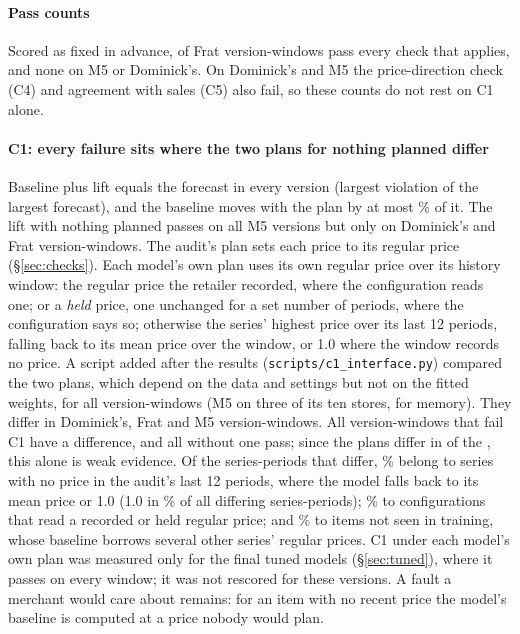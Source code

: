 \paragraph{Pass counts}
Scored as fixed in advance, \rAllF{} of \rWinF{} Frat version-windows pass
every check that applies, and none on M5 or Dominick's. On Dominick's and M5
the price-direction check (C4) and agreement with sales (C5) also fail, so
these counts do not rest on C1 alone.

\paragraph{C1: every failure sits where the two plans for nothing planned differ}
Baseline plus lift equals the forecast in every version (largest violation
\rCaPartsMax{} of the largest forecast), and the baseline moves with the plan by
at most \rCaBaseMax\% of it. The lift with nothing planned passes on all
\rVerM{} M5 versions but only on \rPassDCa{} Dominick's and \rPassFCa{} Frat
version-windows. The audit's plan sets each price to its regular price
(\S\ref{sec:checks}). Each model's own plan uses its own regular price over its
history window: the regular price the retailer recorded, where the
configuration reads one; or a \emph{held} price, one unchanged for a set number
of periods, where the configuration says so; otherwise the series' highest
price over its last 12 periods, falling back to its mean price over the window,
or 1.0 where the window records no price. A script added after the results
(\texttt{scripts/c1\_interface.py}) compared the two plans, which depend on the
data and settings but not on the fitted weights, for all \cIfOf{}
version-windows (M5 on three of its ten stores, for memory). They differ in
\cIfAnyD{} Dominick's, \cIfAnyF{} Frat and \cIfAnyM{} M5 version-windows. All
\cIfFailN{} version-windows that fail C1 have a difference, and all \cIfSameN{}
without one pass; since the plans differ in \cIfDiffN{} of the \cIfOf, this
alone is weak evidence. Of the series-periods that differ, \cIfShareNoReg\%
belong to series with no price in the audit's last 12 periods, where the model
falls back to its mean price or 1.0 (1.0 in \cIfShareOne\% of all differing
series-periods); \cIfShareRule\% to configurations that read a recorded or
held regular price; and \cIfShareNew\% to items not seen in training, whose
baseline borrows several other series' regular prices. C1 under each model's
own plan was measured only for the final tuned models (\S\ref{sec:tuned}),
where it passes on every window; it was not rescored for these versions. A
fault a merchant would care about remains: for an item with no recent price the
model's baseline is computed at a price nobody would plan.


